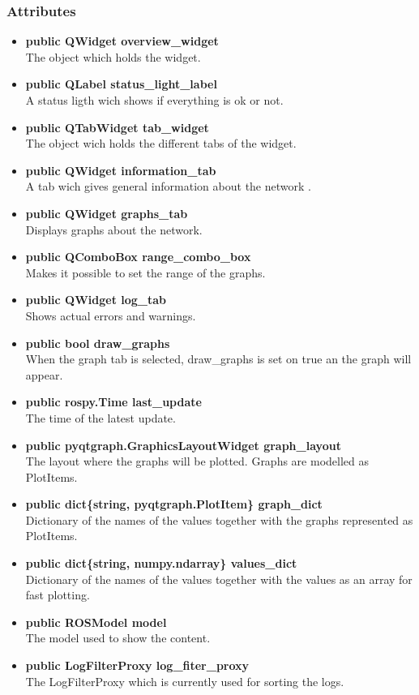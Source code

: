\subsubsection{Attributes}
\begin{itemize}
  \item \textbf{public QWidget overview\_widget}\\
  The object which holds the widget.
  \item \textbf{public QLabel status\_light\_label}\\
  A status ligth wich shows if everything is ok or not.
  \item \textbf{public QTabWidget tab\_widget}\\
  The object wich holds the different tabs of the widget.
  \item \textbf{public QWidget information\_tab}\\
  A tab wich gives general information about the network .
  \item \textbf{public QWidget graphs\_tab}\\
  Displays graphs about the network.
  \item \textbf{public QComboBox range\_combo\_box}\\
  Makes it possible to set the range of the graphs.
  \item \textbf{public QWidget log\_tab}\\
  Shows actual errors and warnings.
  \item \textbf{public bool draw\_graphs}\\
  When the graph tab is selected, draw\_graphs is set on true an the graph will
  appear.
  \item \textbf{public rospy.Time last\_update}\\
  The time of the latest update.
  \item \textbf{public pyqtgraph.GraphicsLayoutWidget graph\_layout}\\
  The layout where the graphs will be plotted. Graphs are modelled as PlotItems.
  \item \textbf{public dict\{string, pyqtgraph.PlotItem\} graph\_dict}\\
  Dictionary of the names of the values together with the graphs represented as PlotItems.
  \item \textbf{public dict\{string, numpy.ndarray\} values\_dict}\\
  Dictionary of the names of the values together with the values as an array for fast plotting.
  \item \textbf{public ROSModel model}\\
  The model used to show the content.
  \item \textbf{public LogFilterProxy log\_fiter\_proxy}\\
  The LogFilterProxy which is currently used for sorting the logs.
  
\end{itemize}
